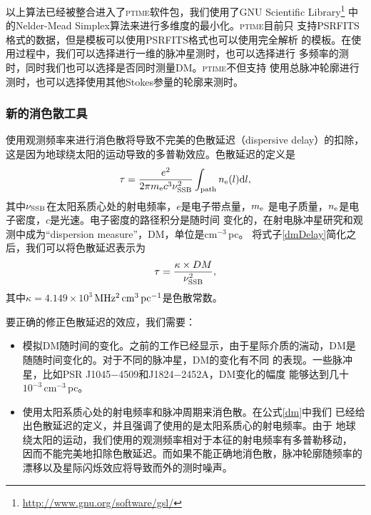 以上算法已经被整合进入了\textsc{ptime}软件包，我们使用了GNU Scientific Library\footnote{\url{http://www.gnu.org/software/gsl/}} 
中的Nelder-Mead Simplex算法来进行多维度的最小化。\textsc{ptime}目前只
支持PSRFITS格式的数据，但是模板可以使用PSRFITS格式也可以使用完全解析
的模板。在使用过程中，我们可以选择进行一维的脉冲星测时，也可以选择进行
多频率的测时，同时我们也可以选择是否同时测量DM。\textsc{ptime}不但支持
使用总脉冲轮廓进行测时，也可以选择使用其他Stokes参量的轮廓来测时。

\subsubsection{新的消色散工具}

使用观测频率来进行消色散将导致不完美的色散延迟（dispersive delay）的扣除，
这是因为地球绕太阳的运动导致的多普勒效应。色散延迟的定义是
\begin{equation}
\label{dmDelay}
\tau=\frac{e^2}{2\pi m_{\rm{e}}c^3\nu_{\rm{SSB}}^2}\int_{\rm{path}}n_{\rm{e}}(l){\rm{d}}l,
\end{equation}
其中$\nu_{\rm{SSB}}$在太阳系质心处的射电频率，$e$是电子带点量，$m_{\rm{e}}$
是电子质量，$n_{\rm{e}}$是电子密度，$c$是光速。电子密度的路径积分是随时间
变化的，在射电脉冲星研究和观测中成为“dispersion measure”，DM，单位是cm$^{-3}$\,pc。
将式子\ref{dmDelay}简化之后，我们可以将色散延迟表示为
\begin{equation}
\tau=\frac{\kappa\times DM}{\nu_{\rm{SSB}}^{2}},
\end{equation}
%
其中$\kappa=4.149\times 10^{3}$\,$\rm{MHz^{2}\,cm^{3}\,pc^{-1}}$是色散常数。

要正确的修正色散延迟的效应，我们需要：
\begin{itemize}
\item 模拟DM随时间的变化。之前的工作已经显示，由于星际介质的湍动，DM是
随随时间变化的\supercite{yhc+07,Keith13}。对于不同的脉冲星，DM的变化有不同
的表现。一些脉冲星，比如PSR J1045$-$4509和J1824$-$2452A，DM变化的幅度
能够达到几十$10^{-3}$\,cm$^{-3}$\,pc。
\item 使用太阳系质心处的射电频率和脉冲周期来消色散。在公式\ref{dm}中我们
已经给出色散延迟的定义，并且强调了使用的是太阳系质心的射电频率。由于
地球绕太阳的运动，我们使用的观测频率相对于本征的射电频率有多普勒移动，
因而不能完美地扣除色散延迟。而如果不能正确地消色散，脉冲轮廓随频率的
漂移以及星际闪烁效应将导致而外的测时噪声。
\end{itemize}

